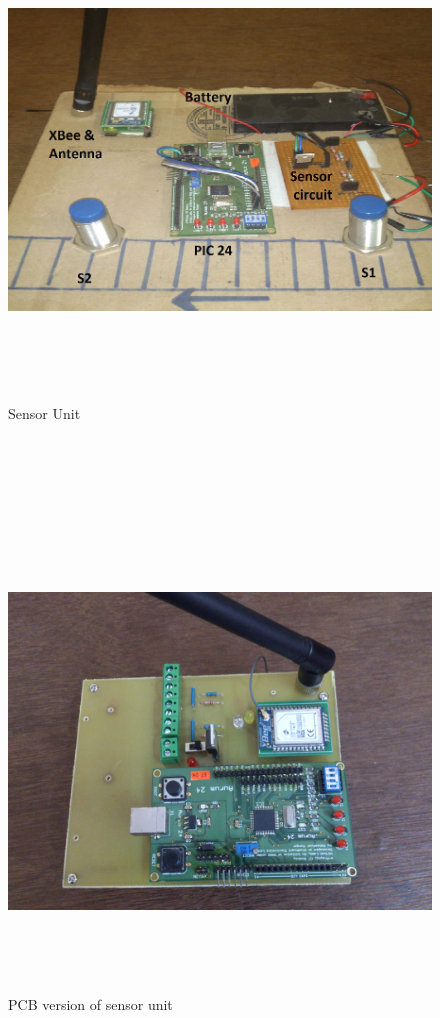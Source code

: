 \documentclass[aps,letterpaper,11pt]{article}
\begin{document}
\newpage
\mbox{}
\\ \\ \\
\begin{figure}[H]
\begin{center}
\includegraphics[height = 5in,width=7in,angle=00]{figures/sensorUnit.JPG}
\caption{\small Sensor Unit}
\end{center}
\end{figure}
\newpage
\mbox{}
\\ \\ \\
\begin{figure}[H]
\begin{center}
\includegraphics[height = 5in,width=7in,angle=00]{figures/sensorPCB.jpg}
\caption{\small PCB version of sensor unit}
\end{center}

\end{figure}
\end{document}
